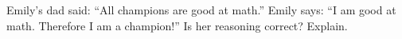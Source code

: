Emily's dad said: ``All champions are good at math.'' Emily says: ``I am good at math. Therefore I am a champion!'' Is her reasoning correct? Explain.
